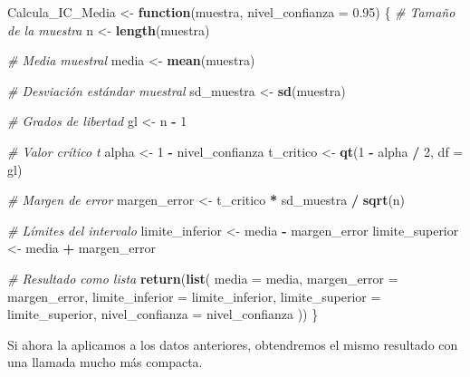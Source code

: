 \documentclass[
]{article}
\newenvironment{Shaded}{\begin{snugshade}}{\end{snugshade}}
\newcommand{\AttributeTok}[1]{\textcolor[rgb]{0.13,0.29,0.53}{#1}}
\newcommand{\CommentTok}[1]{\textcolor[rgb]{0.56,0.35,0.01}{\textit{#1}}}
\newcommand{\ControlFlowTok}[1]{\textcolor[rgb]{0.13,0.29,0.53}{\textbf{#1}}}
\newcommand{\DecValTok}[1]{\textcolor[rgb]{0.00,0.00,0.81}{#1}}
\newcommand{\FloatTok}[1]{\textcolor[rgb]{0.00,0.00,0.81}{#1}}
\newcommand{\FunctionTok}[1]{\textcolor[rgb]{0.13,0.29,0.53}{\textbf{#1}}}
\newcommand{\NormalTok}[1]{#1}
\newcommand{\OtherTok}[1]{\textcolor[rgb]{0.56,0.35,0.01}{#1}}
\newcommand{\SpecialCharTok}[1]{\textcolor[rgb]{0.81,0.36,0.00}{\textbf{#1}}}
\begin{document}
\begin{Shaded}
\begin{Highlighting}[]
\NormalTok{Calcula\_IC\_Media }\OtherTok{\textless{}{-}} \ControlFlowTok{function}\NormalTok{(muestra, }\AttributeTok{nivel\_confianza =} \FloatTok{0.95}\NormalTok{) \{}
  \CommentTok{\# Tamaño de la muestra}
\NormalTok{  n }\OtherTok{\textless{}{-}} \FunctionTok{length}\NormalTok{(muestra)}
  
  \CommentTok{\# Media muestral}
\NormalTok{  media }\OtherTok{\textless{}{-}} \FunctionTok{mean}\NormalTok{(muestra)}
  
  \CommentTok{\# Desviación estándar muestral}
\NormalTok{  sd\_muestra }\OtherTok{\textless{}{-}} \FunctionTok{sd}\NormalTok{(muestra)}
  
  \CommentTok{\# Grados de libertad}
\NormalTok{  gl }\OtherTok{\textless{}{-}}\NormalTok{ n }\SpecialCharTok{{-}} \DecValTok{1}
  
  \CommentTok{\# Valor crítico t}
\NormalTok{  alpha }\OtherTok{\textless{}{-}} \DecValTok{1} \SpecialCharTok{{-}}\NormalTok{ nivel\_confianza}
\NormalTok{  t\_critico }\OtherTok{\textless{}{-}} \FunctionTok{qt}\NormalTok{(}\DecValTok{1} \SpecialCharTok{{-}}\NormalTok{ alpha }\SpecialCharTok{/} \DecValTok{2}\NormalTok{, }\AttributeTok{df =}\NormalTok{ gl)}
  
  \CommentTok{\# Margen de error}
\NormalTok{  margen\_error }\OtherTok{\textless{}{-}}\NormalTok{ t\_critico }\SpecialCharTok{*}\NormalTok{ sd\_muestra }\SpecialCharTok{/} \FunctionTok{sqrt}\NormalTok{(n)}
  
  \CommentTok{\# Límites del intervalo}
\NormalTok{  limite\_inferior }\OtherTok{\textless{}{-}}\NormalTok{ media }\SpecialCharTok{{-}}\NormalTok{ margen\_error}
\NormalTok{  limite\_superior }\OtherTok{\textless{}{-}}\NormalTok{ media }\SpecialCharTok{+}\NormalTok{ margen\_error}
  
  \CommentTok{\# Resultado como lista}
  \FunctionTok{return}\NormalTok{(}\FunctionTok{list}\NormalTok{(}
    \AttributeTok{media =}\NormalTok{ media,}
    \AttributeTok{margen\_error =}\NormalTok{ margen\_error,}
    \AttributeTok{limite\_inferior =}\NormalTok{ limite\_inferior,}
    \AttributeTok{limite\_superior =}\NormalTok{ limite\_superior,}
    \AttributeTok{nivel\_confianza =}\NormalTok{ nivel\_confianza}
\NormalTok{  ))}
\NormalTok{\}}
\end{Highlighting}
\end{Shaded}

Si ahora la aplicamos a los datos anteriores, obtendremos el mismo resultado con una llamada mucho más compacta.
\end{document}
